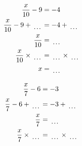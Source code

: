 \documentclass[12pt]{article}
\newcounter{minipagecount}
\begin{document}
\begin{multicols}{2}
\begin{minipage}[t]{0.45\textwidth}
    \raggedright %
    \begin{align*} %
        \frac{x}{10} - 9 &= -4\\
        \frac{x}{10} - 9 + \dotuline{\hspace{5mm}} &= -4 + \dotuline{\hspace{5mm}}\\
        \frac{x}{10} &= \dotuline{\hspace{5mm}}\\
        \frac{x}{10} \times\dotuline{\hspace{5mm}} &= \dotuline{\hspace{5mm}} \times\dotuline{\hspace{5mm}}\\
        x &= \dotuline{\hspace{5mm}}\\
    \end{align*}
\end{minipage} %
\noindent{(\theminipagecount)}\hspace{0.1mm} %
\begin{minipage}[t]{0.45\textwidth} %
    \vspace{-26pt}  %
    \raggedright %
    \begin{align*} %
        \frac{x}{7} - 6 &= -3\\
        \frac{x}{7} - 6 + \dotuline{\hspace{5mm}} &= -3 + \dotuline{\hspace{5mm}}\\
        \frac{x}{7} &= \dotuline{\hspace{5mm}}\\
        \frac{x}{7} \times\dotuline{\hspace{5mm}} &= \dotuline{\hspace{5mm}} \times\dotuline{\hspace{5mm}}\\

\end{align*}
\end{minipage}
\end{multicols}
\end{document}
